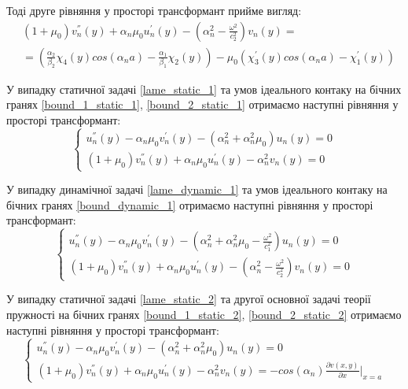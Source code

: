 Тоді друге рівняння у просторі трансформант прийме вигляд:
\begin{align*}
    &(1 + \mu_0) v_n^{''}(y) + \alpha_n \mu_0 u_n^{'}(y)  - (\alpha_n^2 -  \frac{\omega^2}{c_2^2}) v_n(y) = \\ 
    &= (\frac{\alpha_2}{\beta_2}\chi_4(y) cos(\alpha_n a) - \frac{\alpha_1}{\beta_1}\chi_2(y)) - \mu_0 (\chi_3^{'}(y) cos(\alpha_n a) -\chi_1^{'}(y))
\end{align*}

У випадку статичної задачі \eqref{lame_static_1} та умов ідеального контаку на бічних гранях \eqref{bound_1_static_1}, \eqref{bound_2_static_1}
отримаємо наступні рівняння у просторі трансформант:
\begin{equation*}
    \begin{cases}
        u_n^{''}(y) - \alpha_n \mu_0 v_n^{'}(y) -(\alpha_n^2 + \alpha_n^2 \mu_0) u_n(y) = 0 \\
        (1 + \mu_0) v_n^{''}(y) + \alpha_n \mu_0 u_n^{'}(y)  - \alpha_n^2 v_n(y) = 0
    \end{cases}
\end{equation*}

У випадку динамічної задачі \eqref{lame_dynamic_1} та умов ідеального контаку на бічних гранях \eqref{bound_dynamic_1}
отримаємо наступні рівняння у просторі трансформант:
\begin{equation*}
    \begin{cases}
        u_n^{''}(y) - \alpha_n \mu_0 v_n^{'}(y) -(\alpha_n^2 + \alpha_n^2 \mu_0 - \frac{\omega^2}{c_1^2}) u_n(y) = 0 \\
        (1 + \mu_0) v_n^{''}(y) + \alpha_n \mu_0 u_n^{'}(y)  - (\alpha_n^2 -  \frac{\omega^2}{c_2^2}) v_n(y) = 0
    \end{cases}
\end{equation*}

У випадку статичної задачі \eqref{lame_static_2} та другої основної задачі теорії пружності на бічних гранях \eqref{bound_1_static_2}, \eqref{bound_2_static_2}
отримаємо наступні рівняння у просторі трансформант:
\begin{equation*}
    \begin{cases}
        u_n^{''}(y) - \alpha_n \mu_0 v_n^{'}(y) -(\alpha_n^2 + \alpha_n^2 \mu_0) u_n(y) = 0 \\
        (1 + \mu_0) v_n^{''}(y) + \alpha_n \mu_0 u_n^{'}(y)  - \alpha_n^2 v_n(y) = -cos(\alpha_n) \frac{\partial v(x,y)}{\partial x}|_{x=a}
    \end{cases}
\end{equation*}


